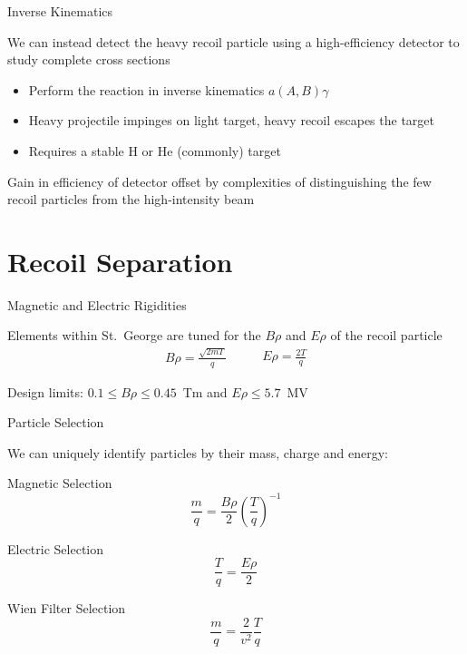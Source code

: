 \documentclass[10pt]{beamer}
\newcommand{\react}[4]{$#1(#2,#3)#4$}
\begin{document}
\begin{frame}[fragile]{Inverse Kinematics}

    We can instead detect the heavy recoil particle using a
    high-efficiency detector to study complete cross sections
    \begin{itemize}
        \item Perform the reaction in inverse kinematics
            \react{a}{A}{B}{\gamma}
        \item Heavy projectile impinges on light target, heavy recoil
            escapes the target
        \item Requires a stable H or He (commonly) target
    \end{itemize}

    Gain in efficiency of detector offset by complexities of
    distinguishing the few recoil particles from the high-intensity beam

\end{frame}

\section{Recoil Separation}

\begin{frame}[fragile]{Magnetic and Electric Rigidities}

    Elements within St.\ George are tuned for the $B\rho$ and $E\rho$ of
    the recoil particle
    \[
        \begin{split}
            B\rho = \frac{\sqrt{2mT}}{q}
        \end{split}
        \quad\quad
        \begin{split}
            E\rho = \frac{2T}{q}
        \end{split}
    \]

    Design limits: $0.1 \leq B\rho \leq 0.45$~Tm and $E\rho \leq 5.7$~MV

\end{frame}

\begin{frame}[fragile]{Particle Selection}

    We can uniquely identify particles by their mass, charge and energy:

    \begin{alertblock}{Magnetic Selection}
        \[
            \frac{m}{q} = \frac{B\rho}{2}\left(\frac{T}{q}\right)^{-1}
        \]
    \end{alertblock}
    \begin{alertblock}{Electric Selection}
        \[
            \frac{T}{q} = \frac{E\rho}{2}
        \]
    \end{alertblock}
    \begin{alertblock}{Wien Filter Selection}
        \[
            \frac{m}{q} = \frac{2}{v^2} \frac{T}{q}
        \]
    \end{alertblock}


\end{frame}
\end{document}

